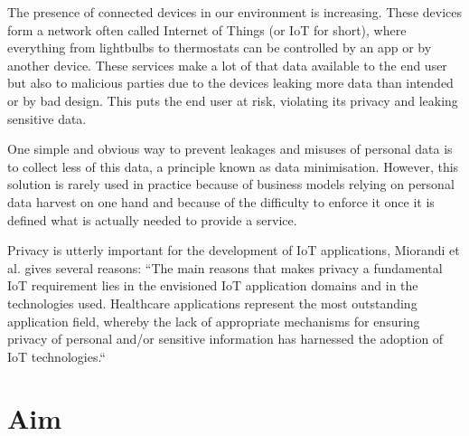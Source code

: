 

The presence of connected devices in our environment is increasing. These devices form a network often called Internet of Things (or IoT for short), where everything from lightbulbs to thermostats can be controlled by an app or by another device. These services make a lot of that data available to the end user but also to malicious parties due to the devices leaking more data than intended or by bad design. This puts the end user at risk, violating its privacy and leaking sensitive data. 

One simple and obvious way to prevent leakages and misuses of personal data is to collect less of this data, a principle known as data minimisation. However, this solution is rarely used in practice because of business models relying on personal data harvest on one hand and because of the difficulty to enforce it once it is defined what is actually needed to provide a service.

Privacy is utterly important for the development of IoT applications, Miorandi et al. gives several reasons: “The main reasons that makes privacy a fundamental IoT requirement lies in the envisioned IoT application domains and in the technologies used. Healthcare applications represent the most outstanding application field, whereby the lack of appropriate mechanisms for ensuring privacy of personal and/or sensitive information has harnessed the adoption of IoT technologies.“ 




\section{Aim}



